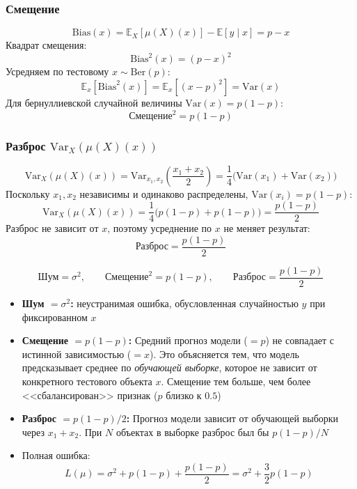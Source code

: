\documentclass[12pt,a4paper]{article}
\begin{document}
\subsubsection*{Смещение}
\[
\text{Bias}(x) = \mathbb{E}_X[\mu(X)(x)] - \mathbb{E}[y\mid x] = p - x
\]
Квадрат смещения:
\[
\text{Bias}^2(x) = (p - x)^2
\]
Усредняем по тестовому $x \sim \text{Ber}(p)$:
\[
\mathbb{E}_x[\text{Bias}^2(x)] = \mathbb{E}_x[(x - p)^2] = \text{Var}(x)
\]
Для бернуллиевской случайной величины $\text{Var}(x) = p(1-p)$:
\[
\text{Смещение}^2 = p(1-p)
\]

\subsubsection*{Разброс $\text{Var}_X(\mu(X)(x))$}

\[
\text{Var}_X(\mu(X)(x)) = \text{Var}_{x_1, x_2}\!\left(\frac{x_1 + x_2}{2}\right) = \frac{1}{4}\bigl(\text{Var}(x_1) + \text{Var}(x_2)\bigr)
\]
Поскольку $x_1, x_2$ независимы и одинаково распределены, $\text{Var}(x_i) = p(1-p)$:
\[
\text{Var}_X(\mu(X)(x)) = \frac{1}{4}\bigl(p(1-p) + p(1-p)\bigr) = \frac{p(1-p)}{2}
\]
Разброс не зависит от $x$, поэтому усреднение по $x$ не меняет результат:
\[
\text{Разброс} = \frac{p(1-p)}{2}
\]

\[
\text{Шум} = \sigma^2, \qquad
\text{Смещение}^2 = p(1-p), \qquad
\text{Разброс} = \frac{p(1-p)}{2}
\]
\begin{itemize}
\item \textbf{Шум $= \sigma^2$:} неустранимая ошибка, обусловленная случайностью $y$ при фиксированном $x$

\item \textbf{Смещение $= p(1-p)$:} Средний прогноз модели ($= p$) не совпадает с истинной зависимостью ($= x$). Это объясняется тем, что модель предсказывает среднее по \textit{обучающей выборке}, которое не зависит от конкретного тестового объекта $x$. Смещение тем больше, чем более <<сбалансирован>> признак ($p$ близко к $0.5$)

\item \textbf{Разброс $= p(1-p)/2$:} Прогноз модели зависит от обучающей выборки через $x_1 + x_2$. При $N$ объектах в выборке разброс был бы $p(1-p)/N$

\item Полная ошибка:
\[
L(\mu) = \sigma^2 + p(1-p) + \frac{p(1-p)}{2} = \sigma^2 + \frac{3}{2}p(1-p)
\]
\end{itemize}
\end{document}
